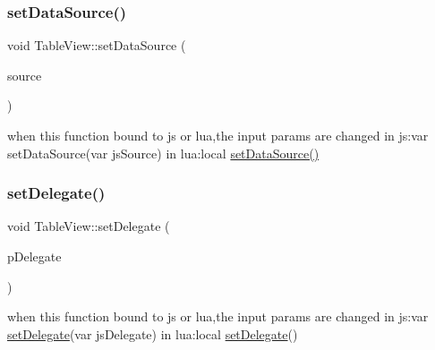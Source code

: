 \subsubsection{\texorpdfstring{set\+Data\+Source()}{setDataSource()}\hspace{0.1cm}{\footnotesize\ttfamily [2/2]}}
{\footnotesize\ttfamily void Table\+View\+::set\+Data\+Source (\begin{DoxyParamCaption}\item[{\hyperlink{classTableViewDataSource}{Table\+View\+Data\+Source} $\ast$}]{source }\end{DoxyParamCaption})\hspace{0.3cm}{\ttfamily [inline]}}

when this function bound to js or lua,the input params are changed in js\+:var set\+Data\+Source(var js\+Source) in lua\+:local \hyperlink{classTableView_a3871ed3e4b512026027371680dd23159}{set\+Data\+Source()}  \mbox{\label{classTableView_afb2bffdd669f02feb74e2534d477dc1b}} 
\subsubsection{\texorpdfstring{set\+Delegate()}{setDelegate()}\hspace{0.1cm}{\footnotesize\ttfamily [1/2]}}
{\footnotesize\ttfamily void Table\+View\+::set\+Delegate (\begin{DoxyParamCaption}\item[{\hyperlink{classTableViewDelegate}{Table\+View\+Delegate} $\ast$}]{p\+Delegate }\end{DoxyParamCaption})\hspace{0.3cm}{\ttfamily [inline]}}


\begin{DoxyCode}
when \textcolor{keyword}{this} \textcolor{keyword}{function} bound to js or lua,the input params are changed
in js:var \hyperlink{classTableView_afb2bffdd669f02feb74e2534d477dc1b}{setDelegate}(var jsDelegate)
in lua:local \hyperlink{classTableView_afb2bffdd669f02feb74e2534d477dc1b}{setDelegate}()
\end{DoxyCode}
 \mbox{\label{classTableView_afb2bffdd669f02feb74e2534d477dc1b}} 
